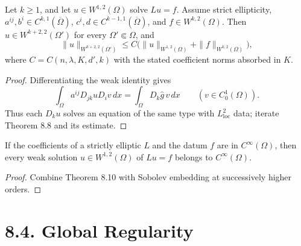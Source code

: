 \begin{theorem}
\label{gt-thm-8-10-higher-interior-regularity}
Let $k\geq1$, and let $u\in W^{1,2}(\Omega)$ solve $Lu=f$. Assume strict
ellipticity, $a^{ij},b^i\in C^{k,1}(\overline\Omega)$,
$c^i,d\in C^{k-1,1}(\overline\Omega)$, and $f\in W^{k,2}(\Omega)$.
Then $u\in W^{k+2,2}(\Omega')$ for every $\Omega'\Subset\Omega$, and
\begin{equation}
\|u\|_{W^{k+2,2}(\Omega')}
\leq C\bigl(\|u\|_{W^{1,2}(\Omega)}+\|f\|_{W^{k,2}(\Omega)}\bigr),
\tag{8.24}
\end{equation}
where $C=C(n,\lambda,K,d',k)$ with the stated coefficient norms absorbed in $K$.
\end{theorem}
\begin{proof}
\sketch Differentiating the weak identity gives
\begin{equation}
\tag{8.23}
\int_\Omega a^{ij}D_{jk}uD_i v\,dx
=\int_\Omega D_k\widehat g\,v\,dx
\qquad(v\in C_0^1(\Omega)).
\end{equation}
Thus each $D_ku$ solves an equation of the
same type with $L^2_{\mathrm{loc}}$ data; iterate Theorem 8.8 and its estimate.
\end{proof}

\begin{corollary}
\label{gt-cor-8-11-interior-smoothness}
If the coefficients of a strictly elliptic $L$ and the datum $f$ are in
$C^\infty(\Omega)$, then every weak solution $u\in W^{1,2}(\Omega)$ of $Lu=f$
belongs to $C^\infty(\Omega)$.
\end{corollary}
\begin{proof}
\sketch Combine Theorem 8.10 with Sobolev embedding at successively higher orders.
\end{proof}

\section*{8.4. Global Regularity}


